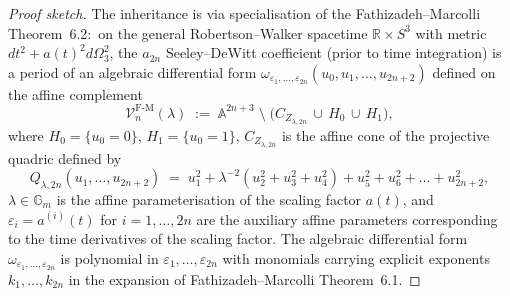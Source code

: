 \documentclass[11pt,a4paper]{article}
\theoremstyle{plain}
\theoremstyle{definition}
\newcommand{\sthree}{S^{3}}
\newcommand{\R}{\mathbb{R}}
\begin{document}
\begin{proof}[Proof sketch]
The inheritance is via specialisation of the
Fathizadeh--Marcolli~\cite{fathizadeh_marcolli2016} Theorem~6.2:\
on the general Robertson--Walker spacetime $\R \times \sthree$ with
metric $dt^2 + a(t)^2 d\Omega_3^2$, the $a_{2n}$ Seeley--DeWitt
coefficient (prior to time integration) is a period of an algebraic
differential form
$\omega_{\varepsilon_1, \ldots, \varepsilon_{2n}}(u_0, u_1, \ldots, u_{2n+2})$
defined on the affine complement
\begin{equation}
\label{eq:fm_complement}
\mathcal{V}_n^{\mathrm{F\text{-}M}}(\lambda)
\;:=\; \mathbb{A}^{2n+3} \;\setminus\;
\bigl( C_{Z_{\lambda, 2n}} \,\cup\, H_0 \,\cup\, H_1 \bigr),
\end{equation}
where $H_0 = \{u_0 = 0\}$, $H_1 = \{u_0 = 1\}$, $C_{Z_{\lambda, 2n}}$
is the affine cone of the projective quadric defined by
\begin{equation}
\label{eq:fm_quadric}
Q_{\lambda, 2n}(u_1, \ldots, u_{2n+2}) \;=\;
u_1^2 + \lambda^{-2}(u_2^2 + u_3^2 + u_4^2)
+ u_5^2 + u_6^2 + \ldots + u_{2n+2}^2,
\end{equation}
$\lambda \in \mathbb{G}_m$ is the affine parameterisation of the scaling
factor $a(t)$, and
$\varepsilon_i = a^{(i)}(t)$ for $i = 1, \ldots, 2n$ are the auxiliary
affine parameters corresponding to the time derivatives of the scaling
factor.  The algebraic differential form
$\omega_{\varepsilon_1, \ldots, \varepsilon_{2n}}$ is polynomial in
$\varepsilon_1, \ldots, \varepsilon_{2n}$ with monomials carrying explicit
exponents $k_1, \ldots, k_{2n}$ in the expansion of Fathizadeh--Marcolli
Theorem~6.1.


\end{proof}
\end{document}

